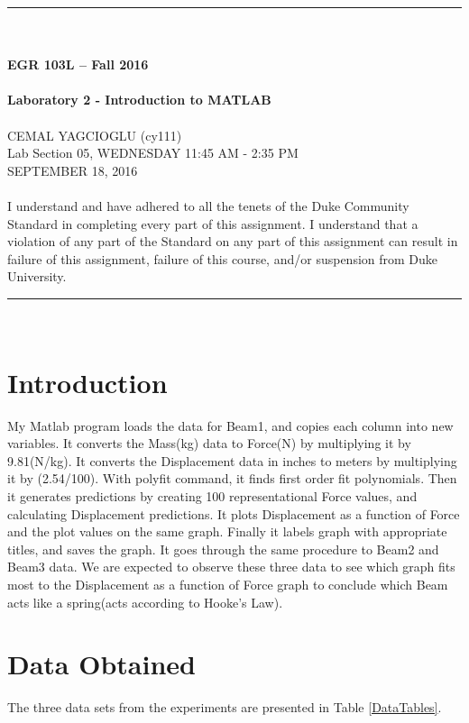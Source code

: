 \documentclass{article}
\begin{document}
\begin{center}
\rule{6.5in}{0.5mm}\\~\\
{\bf \large EGR 103L -- Fall 2016}\\~\\
{\huge \bf Laboratory 2 - Introduction to MATLAB}\\~\\
CEMAL YAGCIOGLU (cy111)\\
Lab Section 05, WEDNESDAY 11:45 AM - 2:35 PM\\
SEPTEMBER 18, 2016\\~\\
{\small I understand and have adhered to all the tenets of the Duke
  Community Standard in completing every part of this assignment.  I
  understand that a violation of any part of the Standard on any part
  of this assignment can result in failure of this assignment, failure
  of this course, and/or suspension from Duke University.} 
\rule{6.5in}{0.5mm}\\
\end{center}
\tableofcontents
\listoffigures
\pagebreak

\section{Introduction}
My Matlab program loads the data for Beam1, and copies each column into new variables. It converts the Mass(kg) data to Force(N) by multiplying it by 9.81(N/kg). It converts the Displacement data in inches to meters by multiplying it by (2.54/100). With polyfit command, it finds first order fit polynomials. Then it generates predictions by creating 100 representational Force values, and calculating Displacement predictions. It plots Displacement as a function of Force and the plot values on the same graph. Finally it labels graph with appropriate titles, and saves the graph. It goes through the same procedure to Beam2 and Beam3 data. We are expected to observe these three data to see which graph fits most to the Displacement as a function of Force graph to conclude which Beam acts like a spring(acts according to Hooke's Law). 

\section{Data Obtained}
The three data sets from the experiments are presented in Table
\ref{DataTables}.
\end{document}
